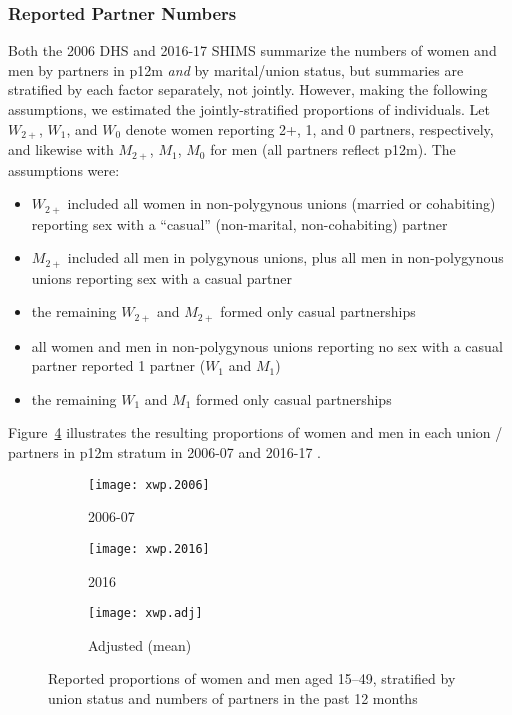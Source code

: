 \subsubsection{Reported Partner Numbers}\label{mod.par.wp.data}
Both the 2006 DHS \cite[Tables 14.6.1 and 14.6.2]{SDHS2006}
and 2016-17 SHIMS \cite[Tables 15.4.A and 15.4.B]{SHIMS2}
summarize the numbers of women and men by partners in p12m \emph{and} by marital/union status,
but summaries are stratified by each factor separately, not jointly.
However, making the following assumptions,
we estimated the jointly-stratified proportions of individuals.
Let $W_{2+}$, $W_{1}$, and $W_{0}$ denote women reporting 2+, 1, and 0 partners, respectively,
and likewise with $M_{2+}$, $M_{1}$, $M_{0}$ for men (all partners reflect p12m).
The assumptions were:
\begin{itemize}
  \item $W_{2+}$ included all women in non-polygynous unions (married or cohabiting)
  reporting sex with a ``casual'' (non-marital, non-cohabiting) partner
  \item $M_{2+}$ included all men in polygynous unions,
  plus all men in non-polygynous unions reporting sex with a casual partner
  \item the remaining $W_{2+}$ and $M_{2+}$ formed only casual partnerships
  \item all women and men in non-polygynous unions
  reporting no sex with a casual partner reported 1 partner ($W_{1}$ and $M_{1}$)
  \item the remaining $W_{1}$ and $M_{1}$ formed only casual partnerships
\end{itemize}
Figure~\ref{fig:xwp} illustrates the resulting
proportions of women and men in each union / partners in p12m stratum
in 2006-07  and 2016-17 .
\begin{figure}
  \centering
  \begin{subfigure}{0.7\linewidth}
    \centering
    \texttt{[image: xwp.2006]}
    \caption{2006-07 \cite{SDHS2006}}
    \label{fig:xwp.2006}
  \end{subfigure}
  \begin{subfigure}{0.7\linewidth}
    \centering
    \texttt{[image: xwp.2016]}
    \caption{2016 \cite{SHIMS2}}
    \label{fig:xwp.2016}
  \end{subfigure}
  \begin{subfigure}{0.7\linewidth}
    \centering
    \texttt{[image: xwp.adj]}
    \caption{Adjusted (mean)}
    \label{fig:xwp.adj}
  \end{subfigure}
  \caption{Reported proportions of women and men aged 15--49,
    stratified by union status and numbers of partners in the past 12 months}
  \label{fig:xwp}
\end{figure}
